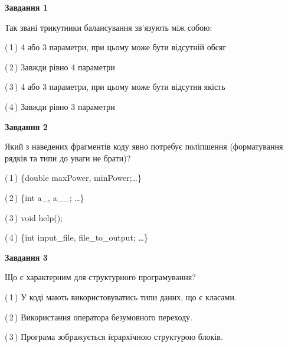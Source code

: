 \documentclass[10pt, ukrainian]{article}
\begin{document}
{
\begin {large}
{\begin {center}\textbf{Завдання 1}\end {center}}\par
Так звані трикутники балансування зв'язують між собою:\par
\vspace{2mm}



(\,1\,) 4 або 3 параметри, при цьому може бути відсутній обсяг %



(\,2\,) Завжди рівно 4 параметри%



(\,3\,) 4 або 3 параметри, при цьому може бути відсутня якість%



(\,4\,) Завжди рівно 3 параметри%


{\begin {center}\textbf{Завдання 2}\end {center}}\par
Який з наведених фрагментів коду явно потребує поліпшення (форматування рядків та типи до уваги не брати)?\par
\vspace{2mm}



(\,1\,) \{double maxPower, minPower;…\} %



(\,2\,) \{int a\_, a\_\_; …\}%



(\,3\,) void help();%



(\,4\,) \{int input\_file, file\_to\_output; …\}%


{\begin {center}\textbf{Завдання 3}\end {center}}\par
Що є характерним для структурного програмування?\par
\vspace{2mm}



(\,1\,) У коді мають використовуватись типи даних, що є класами. %



(\,2\,) Використання оператора безумовного переходу. %



(\,3\,) Програма зображується ієрархічною структурою блоків.%




\end{large}}
\end{document}
